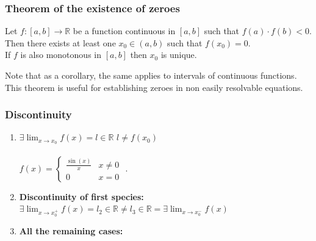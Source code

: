 \documentclass[a4paper]{report}
\begin{document}
\subsubsection{\textbf{Theorem of the existence of zeroes}}
\begin{tcolorbox}
Let $f:\left [ a,b \right ]\rightarrow \mathbb{R}$ be a function  continuous in $\left [ a,b \right ]$ such that $f\left ( a \right )\cdot f\left ( b \right )< 0$. Then there exists at least one $x_{0}\in \left ( a,b \right )$ such that $f\left ( x_{0} \right )=0$.\\
If $f$ is also monotonous in $\left [ a,b \right ]$ then $x_{0}$ is unique.
\end{tcolorbox}
Note that as a corollary, the same applies to intervals of continuous functions. This theorem is useful for establishing zeroes in non easily resolvable equations.
\subsubsection{\textbf{Discontinuity}}
\begin{enumerate}
    \item $\exists \lim_{x \to x_{0}} f\left ( x \right )=l\in\mathbb{R}$  $l\neq f\left ( x_{0} \right )$ \\ \\
    $f\left ( x \right )=\left\{\begin{matrix}
\frac{\sin\left ( x \right )}{x} & x\neq 0\\ 
0 & x=0
\end{matrix}\right.$ .
\item \textbf{Discontinuity of first species: }\\$\exists \lim_{x \to x_{0}^{+}} f\left ( x \right )=l_{2}\in\mathbb{R} \neq l_{3}\in\mathbb{R}=\exists \lim_{x \to x_{0}^{-}}f\left ( x \right )$ \\ 
\item \textbf{All the remaining cases: }\\ \\ 
\end{enumerate}
\end{document}
